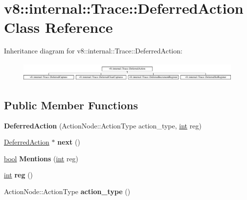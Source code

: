 \hypertarget{classv8_1_1internal_1_1Trace_1_1DeferredAction}{}\section{v8\+:\+:internal\+:\+:Trace\+:\+:Deferred\+Action Class Reference}
\label{classv8_1_1internal_1_1Trace_1_1DeferredAction}
Inheritance diagram for v8\+:\+:internal\+:\+:Trace\+:\+:Deferred\+Action\+:\begin{figure}[H]
\begin{center}
\leavevmode
\includegraphics[height=1.003584cm]{classv8_1_1internal_1_1Trace_1_1DeferredAction}
\end{center}
\end{figure}
\subsection*{Public Member Functions}
\begin{DoxyCompactItemize}
\item 
\mbox{\label{classv8_1_1internal_1_1Trace_1_1DeferredAction_a780db5684ee3c089249f0e3a706ec980}} 
{\bfseries Deferred\+Action} (Action\+Node\+::\+Action\+Type action\+\_\+type, \mbox{\hyperlink{classint}{int}} reg)
\item 
\mbox{\label{classv8_1_1internal_1_1Trace_1_1DeferredAction_acd45c461c5e1ed04f88be43d0c8219bf}} 
\mbox{\hyperlink{classv8_1_1internal_1_1Trace_1_1DeferredAction}{Deferred\+Action}} $\ast$ {\bfseries next} ()
\item 
\mbox{\label{classv8_1_1internal_1_1Trace_1_1DeferredAction_a21dc8aabaf396310ae95c56477bf55bd}} 
\mbox{\hyperlink{classbool}{bool}} {\bfseries Mentions} (\mbox{\hyperlink{classint}{int}} reg)
\item 
\mbox{\label{classv8_1_1internal_1_1Trace_1_1DeferredAction_af1d99354c745bba3171ad4f7f2203246}} 
\mbox{\hyperlink{classint}{int}} {\bfseries reg} ()
\item 
\mbox{\label{classv8_1_1internal_1_1Trace_1_1DeferredAction_a7b2e8c58b919f2462e71c1e592a37582}} 
Action\+Node\+::\+Action\+Type {\bfseries action\+\_\+type} ()
\end{DoxyCompactItemize}
